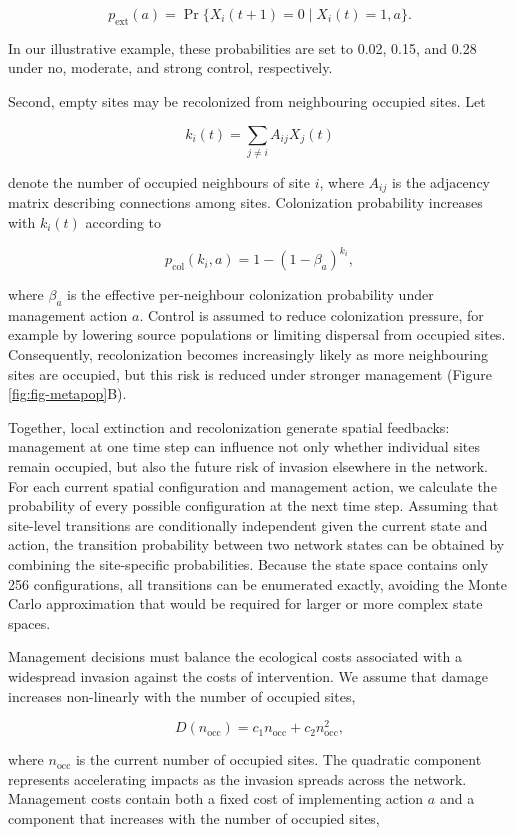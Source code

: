 \documentclass[
  11pt,
  a4paper,
]{article}
\begin{document}
\[
p_{\mathrm{ext}}(a)
=
\Pr\{X_i(t+1)=0 \mid X_i(t)=1,a\}.
\]

In our illustrative example, these probabilities are set to 0.02, 0.15, and 0.28 under no, moderate, and strong control, respectively.

Second, empty sites may be recolonized from neighbouring occupied sites. Let

\[
k_i(t)
=
\sum_{j \neq i}
A_{ij}X_j(t)
\]

denote the number of occupied neighbours of site \(i\), where \(A_{ij}\) is the adjacency matrix describing connections among sites. Colonization probability increases with \(k_i(t)\) according to

\[
p_{\mathrm{col}}(k_i,a)
=
1-
\left(
1-\beta_a
\right)^{k_i},
\]

where \(\beta_a\) is the effective per-neighbour colonization probability under management action \(a\). Control is assumed to reduce colonization pressure, for example by lowering source populations or limiting dispersal from occupied sites. Consequently, recolonization becomes increasingly likely as more neighbouring sites are occupied, but this risk is reduced under stronger management (Figure \ref{fig:fig-metapop}B).

Together, local extinction and recolonization generate spatial feedbacks: management at one time step can influence not only whether individual sites remain occupied, but also the future risk of invasion elsewhere in the network. For each current spatial configuration and management action, we calculate the probability of every possible configuration at the next time step. Assuming that site-level transitions are conditionally independent given the current state and action, the transition probability between two network states can be obtained by combining the site-specific probabilities. Because the state space contains only 256 configurations, all transitions can be enumerated exactly, avoiding the Monte Carlo approximation that would be required for larger or more complex state spaces.

Management decisions must balance the ecological costs associated with a widespread invasion against the costs of intervention. We assume that damage increases non-linearly with the number of occupied sites,

\[
D(n_{\mathrm{occ}})
=
c_1 n_{\mathrm{occ}}
+
c_2 n_{\mathrm{occ}}^2,
\]

where \(n_{\mathrm{occ}}\) is the current number of occupied sites. The quadratic component represents accelerating impacts as the invasion spreads across the network. Management costs contain both a fixed cost of implementing action \(a\) and a component that increases with the number of occupied sites,
\end{document}
